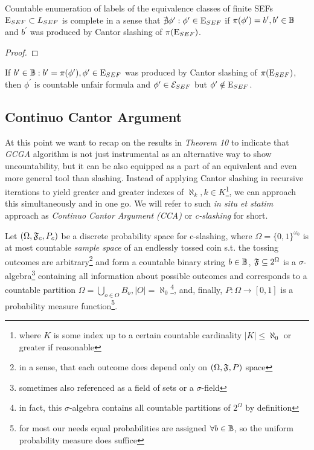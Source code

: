 \begin{theorem}
  Countable enumeration of labels of the equivalence classes of finite SEFs $\mathrm{E}_{SEF} \subset L_{SEF}$ is complete in a sense that $\nexists \phi^\prime: \phi^\prime \in \mathrm{E}_{SEF}$ if $\pi(\phi^\prime) = b^\prime, b^\prime \in \mathbb{B}$ and $b^\prime$ was produced by Cantor slashing of $\pi(\mathrm{E}_{SEF})$.
\end{theorem}
\begin{proof}
\end{proof}

\begin{corollary}
  If $b^\prime \in \mathbb{B} : b^\prime = \pi(\phi^\prime), \phi^\prime \in \mathrm{E}_{SEF}$ was produced by Cantor slashing of $\pi(\mathrm{E}_{SEF})$, then $\phi^\prime$ is countable unfair formula and $\phi^\prime \in \mathcal{E}_{SEF}$ but $\phi^\prime \notin \mathrm{E}_{SEF}$.
\end{corollary}

\subsection{Continuo Cantor Argument}\label{subsec_cslash}

At this point we want to recap on the results in \textit{Theorem 10} to indicate that \textit{GCGA} algorithm is not just instrumental as an alternative way to show uncountability, but it can be also equipped as a part of an equivalent and even more general tool than slashing. Instead of applying Cantor slashing in recursive iterations to yield greater and greater indexes of $\aleph_k, k \in K$\footnote{where $K$ is some index up to a certain countable cardinality $|K| \leq \aleph_0$ or greater if reasonable}, we can approach this simultaneously and in one go. We will refer to such \textit{in situ et statim} approach as \textit{Continuo Cantor Argument (CCA)} or \textit{c-slashing} for short.

\begin{definition}
  Let $(\Omega,\mathfrak{F}_c,P_c)$ be a discrete probability space\cite{kolmogorov2019foundations} for c-slashing, where $\Omega = \{0, 1\}^{\omega_0}$ is at most countable \textit{sample space} of an endlessly tossed coin s.t. the tossing outcomes are arbitrary\footnote{in a sense, that each outcome does depend only on $(\Omega,\mathfrak{F},P)$ space} and form a countable binary string $b \in \mathbb{B}$, $\mathfrak{F} \subseteq 2^{\Omega}$ is a $\sigma$-algebra\footnote{sometimes also referenced as a field of sets\cite{kolmogorov2019foundations} or a $\sigma$-field} containing all information about possible outcomes and corresponds to a countable partition $\Omega = \bigcup_{o \in O} B_{o}, |O| = \aleph_0$\footnote{in fact, this $\sigma$-algebra contains all countable partitions of $2^{\Omega}$ by definition}, and, finally, $P: \Omega \to [0,1]$ is a probability measure function\footnote{for most our needs equal probabilities are assigned $\forall b \in \mathbb{B}$, so the uniform probability measure does suffice}.
\end{definition}

